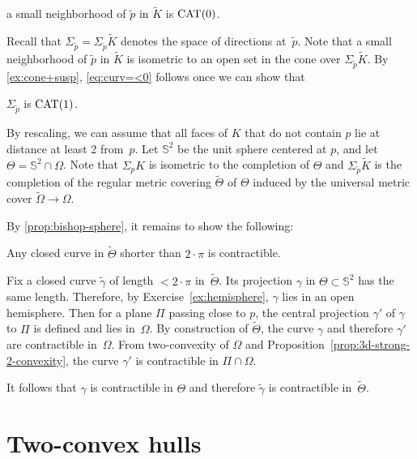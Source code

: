 \begin{clm}{}\label{eq:curv=<0}
a small neighborhood of $\tilde p$ in $\tilde K$ is $\mathrm{CAT}(0)$.
\end{clm}

Recall that $\Sigma_{\tilde p}=\Sigma_{\tilde p}\tilde K$ denotes the space of directions at~$\tilde p$.
Note that a small neighborhood of $\tilde p$ in $\tilde K$
is isometric to an open set in the cone over $\Sigma_{\tilde p}\tilde K$.
By \ref{ex:cone+susp}, \ref{eq:curv=<0} follows once we can show that

\begin{clm}{}\label{eq:curv=<1}
$\Sigma_{\tilde p}$ is $\mathrm{CAT}(1)$.
\end{clm}

By rescaling, we can assume that all faces of $K$ that do not contain $p$ lie at distance at least 2 from~$p$.
Let $\mathbb{S}^2$ be the unit sphere centered at $p$,
and let $\Theta=\mathbb{S}^2\cap\Omega$.
Note that $\Sigma_pK$ is isometric to the completion of $\Theta$
and $\Sigma_{\tilde p}\tilde K$ is the completion of the regular metric covering $\tilde\Theta$ of $\Theta$ induced by the universal metric cover $\tilde \Omega\to \Omega$.

By \ref{prop:bishop-sphere}, it remains to show the following:
\begin{clm}{}
Any closed curve in $\tilde\Theta$ shorter than $2\cdot\pi$ is contractible.
\end{clm}

Fix a closed curve $\tilde \gamma$ of length $<2\cdot\pi$ in~$\tilde\Theta$.
Its projection $\gamma$ in $\Theta\subset\mathbb{S}^2$ has the same length.
Therefore, by Exercise~\ref{ex:hemisphere}, $\gamma$ lies in an open hemisphere.
Then for a plane $\Pi$ passing close to $p$,
the central projection $\gamma'$ of $\gamma$ to $\Pi$ is defined and lies in~$\Omega$.
By construction of $\tilde\Theta$, the curve $\gamma$ and therefore $\gamma'$ are contractible in~$\Omega$.
From two-convexity of $\Omega$
and Proposition~\ref{prop:3d-strong-2-convexity},
the curve $\gamma'$ is contractible in $\Pi\cap \Omega$.

It follows that $\gamma$ is contractible in $\Theta$ 
and therefore $\tilde\gamma$ is contractible in~$\tilde\Theta$.
\qeds

\section{Two-convex hulls}\label{sec:Two-convex hulls}

